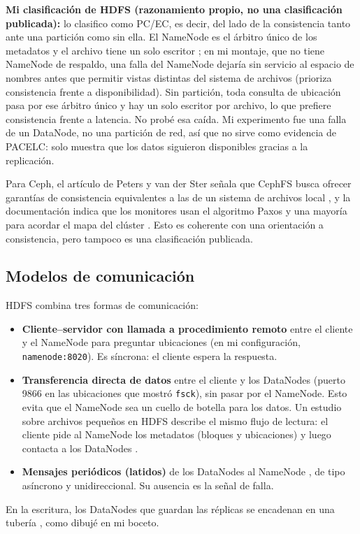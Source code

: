 \documentclass[11pt,a4paper]{article}
\begin{document}
\textbf{Mi clasificación de HDFS (razonamiento propio, no una clasificación publicada):} lo clasifico como PC/EC, es decir, del lado de la consistencia tanto ante una partición como sin ella. El NameNode es el árbitro único de los metadatos y el archivo tiene un solo escritor \cite{HadoopHDFSDesign}; en mi montaje, que no tiene NameNode de respaldo, una falla del NameNode dejaría sin servicio al espacio de nombres antes que permitir vistas distintas del sistema de archivos (prioriza consistencia frente a disponibilidad). Sin partición, toda consulta de ubicación pasa por ese árbitro único y hay un solo escritor por archivo, lo que prefiere consistencia frente a latencia. No probé esa caída. Mi experimento fue una falla de un DataNode, no una partición de red, así que no sirve como evidencia de PACELC: solo muestra que los datos siguieron disponibles gracias a la replicación.

Para Ceph, el artículo de Peters y van der Ster señala que CephFS busca ofrecer garantías de consistencia equivalentes a las de un sistema de archivos local \cite{Peters2021}, y la documentación indica que los monitores usan el algoritmo Paxos y una mayoría para acordar el mapa del clúster \cite{CephArchitecture}. Esto es coherente con una orientación a consistencia, pero tampoco es una clasificación publicada.

\subsection{Modelos de comunicación}
HDFS combina tres formas de comunicación:
\begin{itemize}
  \item \textbf{Cliente--servidor con llamada a procedimiento remoto} entre el cliente y el NameNode para preguntar ubicaciones (en mi configuración, \texttt{namenode:8020}). Es síncrona: el cliente espera la respuesta.
  \item \textbf{Transferencia directa de datos} entre el cliente y los DataNodes (puerto 9866 en las ubicaciones que mostró \texttt{fsck}), sin pasar por el NameNode. Esto evita que el NameNode sea un cuello de botella para los datos. Un estudio sobre archivos pequeños en HDFS describe el mismo flujo de lectura: el cliente pide al NameNode los metadatos (bloques y ubicaciones) y luego contacta a los DataNodes \cite{Alange2023}.
  \item \textbf{Mensajes periódicos (latidos)} de los DataNodes al NameNode \cite{HadoopHDFSDesign}, de tipo asíncrono y unidireccional. Su ausencia es la señal de falla.
\end{itemize}
En la escritura, los DataNodes que guardan las réplicas se encadenan en una tubería \cite{HadoopHDFSDesign}, como dibujé en mi boceto.
\end{document}
